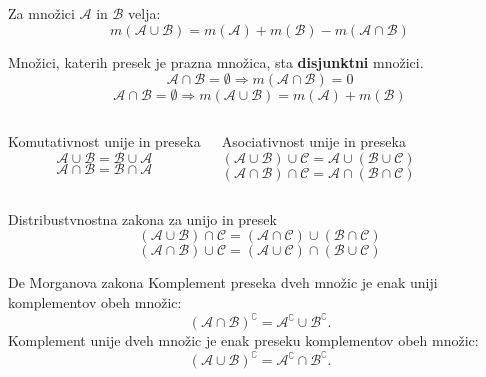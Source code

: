     \begin{frame}

        \begin{block}{}
            Za množici $\mathcal{A}$ in $\mathcal{B}$ velja:
            $$m(\mathcal{A}\cup\mathcal{B})=m(\mathcal{A})+m(\mathcal{B})-m(\mathcal{A}\cap\mathcal{B}) $$
        \end{block}

        \begin{block}{}
            Množici, katerih presek je prazna množica, sta \textbf{disjunktni} množici.
            $$\mathcal{A}\cap\mathcal{B}=\emptyset\Rightarrow m(\mathcal{A}\cap\mathcal{B})=0 $$ 
            $$\mathcal{A}\cap\mathcal{B}=\emptyset\Rightarrow m(\mathcal{A}\cup\mathcal{B})=m(\mathcal{A})+m(\mathcal{B}) $$
        \end{block}

        \begin{columns}[T]
                \begin{block}{Komutativnost unije in preseka}
                    $$ \mathcal{A}\cup\mathcal{B}=\mathcal{B}\cup\mathcal{A} $$
                    $$ \mathcal{A}\cap\mathcal{B}=\mathcal{B}\cap\mathcal{A} $$
                \end{block}

                \begin{block}{Asociativnost unije in preseka}
                    $$ \left(\mathcal{A}\cup\mathcal{B}\right)\cup\mathcal{C}=\mathcal{A}\cup\left(\mathcal{B}\cup\mathcal{C}\right) $$
                    $$ \left(\mathcal{A}\cap\mathcal{B}\right)\cap\mathcal{C}=\mathcal{A}\cap\left(\mathcal{B}\cap\mathcal{C}\right) $$
                \end{block}

        \end{columns}

    \end{frame}

    \begin{frame}
        \begin{block}{Distribustvnostna zakona za unijo in presek}
            $$ \left(\mathcal{A}\cup\mathcal{B}\right)\cap\mathcal{C}=\left(\mathcal{A}\cap\mathcal{C}\right)\cup\left(\mathcal{B}\cap\mathcal{C}\right) $$
            $$ \left(\mathcal{A}\cap\mathcal{B}\right)\cup\mathcal{C}=\left(\mathcal{A}\cup\mathcal{C}\right)\cap\left(\mathcal{B}\cup\mathcal{C}\right) $$
        \end{block}

        \begin{block}{De Morganova zakona}
            Komplement preseka dveh množic je enak uniji komplementov obeh množic:
            $$\left(\mathcal{A}\cap\mathcal{B}\right)^\complement=\mathcal{A}^\complement\cup\mathcal{B}^\complement. $$
            Komplement unije dveh množic je enak preseku komplementov obeh množic:
            $$\left(\mathcal{A}\cup\mathcal{B}\right)^\complement=\mathcal{A}^\complement\cap\mathcal{B}^\complement. $$
        \end{block}
    \end{frame}

